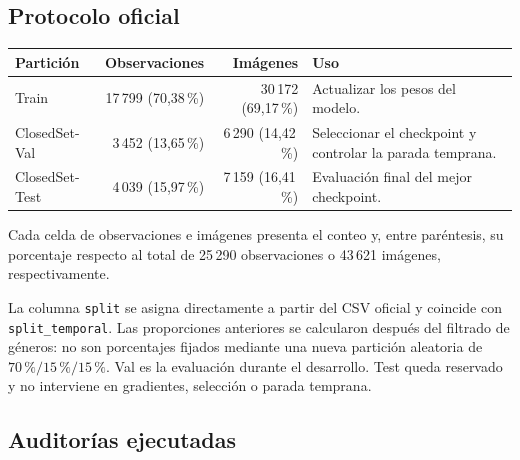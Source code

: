\documentclass[11pt,a4paper]{article}
\newcommand{\archivo}[1]{\nolinkurl{#1}}
\begin{document}
\subsection{Protocolo oficial}

\begin{center}
\small
\begin{tabularx}{\textwidth}{lrrY}
\toprule
\textbf{Partición} & \textbf{Observaciones} & \textbf{Imágenes} & \textbf{Uso}\\
\midrule
Train & 17\,799 (70,38\,\%) & 30\,172 (69,17\,\%) & Actualizar los pesos del modelo.\\
ClosedSet-Val & 3\,452 (13,65\,\%) & 6\,290 (14,42\,\%) & Seleccionar el checkpoint y controlar la parada temprana.\\
ClosedSet-Test & 4\,039 (15,97\,\%) & 7\,159 (16,41\,\%) & Evaluación final del mejor checkpoint.\\
\bottomrule
\end{tabularx}
\end{center}

Cada celda de observaciones e imágenes presenta el conteo y, entre paréntesis,
su porcentaje respecto al total de 25\,290 observaciones o 43\,621 imágenes,
respectivamente.

La columna \archivo{split} se asigna directamente a partir del CSV oficial y
coincide con \archivo{split_temporal}. Las proporciones anteriores se calcularon
después del filtrado de géneros: no son porcentajes fijados mediante una nueva
partición aleatoria de \(70\,\%/15\,\%/15\,\%\). Val es la evaluación durante el desarrollo.
Test queda reservado y no interviene en gradientes, selección o parada temprana.

\subsection{Auditorías ejecutadas}
\end{document}
